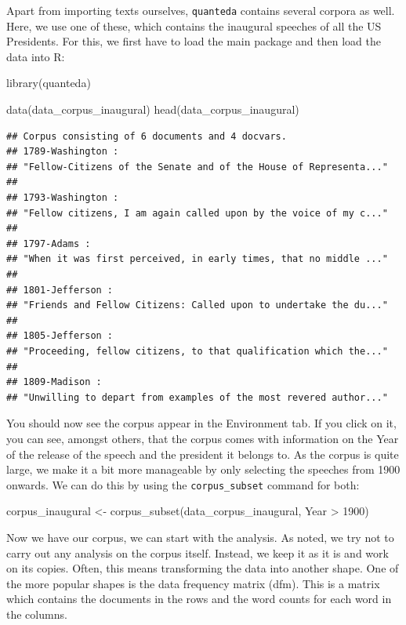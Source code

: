 \documentclass[
]{book}
\newenvironment{Shaded}{\begin{snugshade}}{\end{snugshade}}
\newcommand{\DecValTok}[1]{\textcolor[rgb]{0.00,0.00,0.81}{#1}}
\newcommand{\FunctionTok}[1]{\textcolor[rgb]{0.00,0.00,0.00}{#1}}
\newcommand{\NormalTok}[1]{#1}
\newcommand{\OtherTok}[1]{\textcolor[rgb]{0.56,0.35,0.01}{#1}}
\newcommand{\SpecialCharTok}[1]{\textcolor[rgb]{0.00,0.00,0.00}{#1}}
\begin{document}
Apart from importing texts ourselves, \texttt{quanteda} contains several corpora as well. Here, we use one of these, which contains the inaugural speeches of all the US Presidents. For this, we first have to load the main package and then load the data into R:

\begin{Shaded}
\begin{Highlighting}[]
\FunctionTok{library}\NormalTok{(quanteda)}

\FunctionTok{data}\NormalTok{(data\_corpus\_inaugural)}
\FunctionTok{head}\NormalTok{(data\_corpus\_inaugural)}
\end{Highlighting}
\end{Shaded}

\begin{verbatim}
## Corpus consisting of 6 documents and 4 docvars.
## 1789-Washington :
## "Fellow-Citizens of the Senate and of the House of Representa..."
## 
## 1793-Washington :
## "Fellow citizens, I am again called upon by the voice of my c..."
## 
## 1797-Adams :
## "When it was first perceived, in early times, that no middle ..."
## 
## 1801-Jefferson :
## "Friends and Fellow Citizens: Called upon to undertake the du..."
## 
## 1805-Jefferson :
## "Proceeding, fellow citizens, to that qualification which the..."
## 
## 1809-Madison :
## "Unwilling to depart from examples of the most revered author..."
\end{verbatim}

You should now see the corpus appear in the Environment tab. If you click on it, you can see, amongst others, that the corpus comes with information on the Year of the release of the speech and the president it belongs to. As the corpus is quite large, we make it a bit more manageable by only selecting the speeches from 1900 onwards. We can do this by using the \texttt{corpus\_subset} command for both:

\begin{Shaded}
\begin{Highlighting}[]
\NormalTok{corpus\_inaugural }\OtherTok{\textless{}{-}} \FunctionTok{corpus\_subset}\NormalTok{(data\_corpus\_inaugural, Year }\SpecialCharTok{\textgreater{}} \DecValTok{1900}\NormalTok{)}
\end{Highlighting}
\end{Shaded}

Now we have our corpus, we can start with the analysis. As noted, we try not to carry out any analysis on the corpus itself. Instead, we keep it as it is and work on its copies. Often, this means transforming the data into another shape. One of the more popular shapes is the data frequency matrix (dfm). This is a matrix which contains the documents in the rows and the word counts for each word in the columns.
\end{document}
